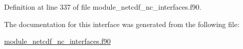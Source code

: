 Definition at line 337 of file module\+\_\+netcdf\+\_\+nc\+\_\+interfaces.\+f90.



The documentation for this interface was generated from the following file\+:\begin{DoxyCompactItemize}
\item 
\hyperlink{module__netcdf__nc__interfaces_8f90}{module\+\_\+netcdf\+\_\+nc\+\_\+interfaces.\+f90}\end{DoxyCompactItemize}

